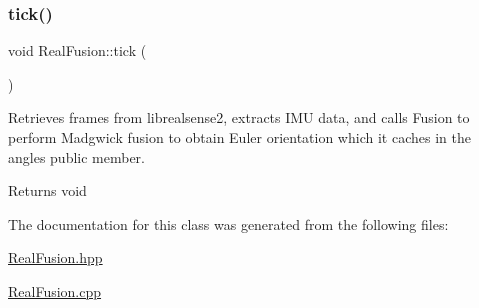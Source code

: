 \subsubsection{\texorpdfstring{tick()}{tick()}}
{\footnotesize\ttfamily void Real\+Fusion\+::tick (\begin{DoxyParamCaption}{ }\end{DoxyParamCaption})}



Retrieves frames from librealsense2, extracts I\+MU data, and calls Fusion to perform Madgwick fusion to obtain Euler orientation which it caches in the angles public member. 

\begin{DoxyReturn}{Returns}
void 
\end{DoxyReturn}


The documentation for this class was generated from the following files\+:\begin{DoxyCompactItemize}
\item 
\hyperlink{RealFusion_8hpp}{Real\+Fusion.\+hpp}\item 
\hyperlink{RealFusion_8cpp}{Real\+Fusion.\+cpp}\end{DoxyCompactItemize}
